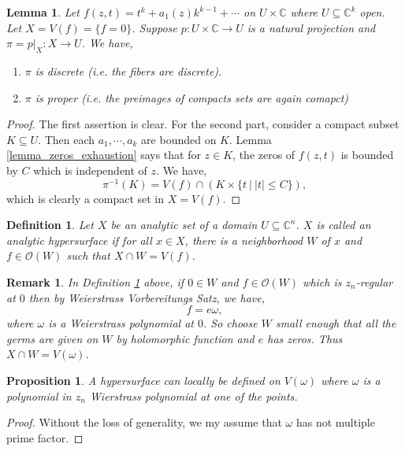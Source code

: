 \documentclass{article}
\newtheorem{proposition}{Proposition}[section]
\newtheorem{definition}{Definition}[section]
\newtheorem{lemma}{Lemma}[section]
\newtheorem{remark}{Remark}[section]
\newcommand{\C}[0]{\mathbb{C}}
\newcommand{\sep}[0]{\:|\:}
\begin{document}
\begin{lemma}
Let $f(z,t) = t^k+a_1(z)k^{k-1}+\cdots$ on $U\times \C$ where $U\subseteq\C^k$ open. Let $X = V(f)=\{f=0\}$. Suppose $p:U\times \C\to U$ is a natural projection and $\pi=p|_X:X\to U$. We have,
\begin{enumerate}[1).]
  \item $\pi$ is discrete (i.e. the fibers are discrete).
  \item $\pi$ is proper (i.e. the preimages of compacts sets are again comapct)
\end{enumerate}
\end{lemma}

\begin{proof}
  The first assertion is clear. For the second part, consider a compact subset $K\subseteq U$. Then each $a_1,\cdots, a_k$ are bounded on $K$. Lemma \ref{lemma_zeros_exhaustion} says that for $z\in K$, the zeros of $f(z,t)$ is bounded by $C$ which is independent of $z$. We have,
  \begin{equation*}
    \pi^{-1}(K) = V(f)\cap (K\times \{t\sep \vert t\vert\leq C\}),
  \end{equation*} 
  which is clearly a compact set in $X=V(f)$.
\end{proof}

\begin{definition}
  \label{defintion_analytic_hypersurface}
  Let $X$ be an analytic set of a domain $U\subseteq \C^n$. $X$ is called an analytic hypersurface if for all $x\in X$, there is a neighborhood $W$ of $x$ and $f\in \mathcal{O}(W)$ such that $X\cap W = V(f)$.
\end{definition}

\begin{remark}
  In Definition \ref{defintion_analytic_hypersurface} above, if $0\in W$ and $f\in\mathcal{O}(W)$ which is $z_n$-regular at $0$ then by Weierstrass Vorbereitungs Satz, we have,
  \begin{equation*}
    f = e\omega,
  \end{equation*}
  where $\omega$ is a Weierstrass polynomial at $0$. So choose $W$ small enough that all the germs are given on $W$ by holomorphic function and $e$ has zeros. Thus $X\cap W = V(\omega)$.
\end{remark}

\begin{proposition}
A hypersurface can locally be defined on $V(\omega)$ where $\omega$ is a polynomial in $z_n$ Wierstrass polynomial at one of the points. %
\end{proposition}
\begin{proof}
  Without the loss of generality, we my assume that $\omega$ has not multiple prime factor.
\end{proof}
\end{document}
